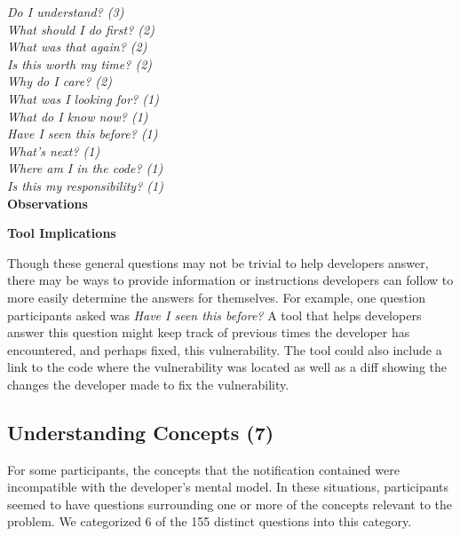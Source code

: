 \documentclass[conference]{IEEEtran}
\begin{document}
\noindent\emph{Do I understand? (3)} \\
\emph{What should I do first? (2)} \\
\emph{What was that again? (2)} \\
\emph{Is this worth my time? (2)} \\
\emph{Why do I care? (2)} \\
\emph{What was I looking for? (1)} \\
\emph{What do I know now? (1)} \\
\emph{Have I seen this before? (1)} \\
\emph{What's next? (1)} \\
\emph{Where am I in the code? (1)} \\
\emph{Is this my responsibility? (1)} \\



\noindent\textbf{Observations}



\noindent\textbf{Tool Implications}

Though these general questions may not be trivial to help developers answer, there may be ways to provide information or instructions developers can follow to more easily determine the answers for themselves. 
For example, one question participants asked was \textit{Have I seen this before?}
A tool that helps developers answer this question might keep track of previous times the developer has encountered, and perhaps fixed, this vulnerability. 
The tool could also include a link to the code where the vulnerability was located as well as a diff showing the changes the developer made to fix the vulnerability.



\noindent\subsection{\textbf{Understanding Concepts (7)}}\label{uc}

For some participants, the concepts that the notification contained were incompatible with the developer's mental model. 
In these situations, participants seemed to have questions surrounding one or more of the concepts relevant to the problem.
We categorized 6 of the 155 distinct questions into this category. 
\\
\end{document}
